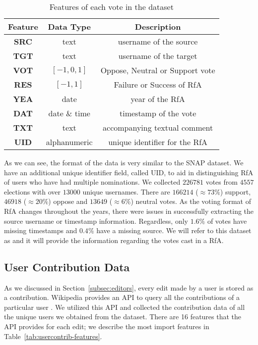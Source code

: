 \begin{table}[htp]
    \centering
    \caption{Features of each vote in the \wikirfa dataset}
    \label{tab:wiki-rfa-features}
    \begin{tabular}{ccc}
        \toprule
        Feature & Data Type & Description\\
        \midrule
        \textbf{SRC}&text & username of the source\\
        \textbf{TGT}&text & username of the target\\
        \textbf{VOT}&$[-1,0,1]$& Oppose, Neutral or Support vote\\
        \textbf{RES}&$[-1,1]$ & Failure or Success of RfA\\
        \textbf{YEA}&date & year of the RfA\\
        \textbf{DAT}& date \& time & timestamp of the vote\\
        \textbf{TXT}&text &accompanying textual comment \\
        \textbf{UID}&alphanumeric&  unique identifier for the RfA\\
        \bottomrule
    \end{tabular}
\end{table}
As we can see, the format of the data is very similar to the SNAP dataset.
We have an additional unique identifier field, called UID, to aid in distinguishing RfA of users who have had multiple nominations.
We collected $226781$ votes from $4557$ elections with over $13000$ unique usernames. There are $166214$ ($\approx 73\%$) support, $46918$ ($\approx 20\%$) oppose and $13649$ ($\approx 6\%$) neutral votes.
As the voting format of RfA changes throughout the years, there were issues in successfully extracting the source username or timestamp information. 
Regardless, only $1.6\%$ of votes have missing timestamps and $0.4\%$ have a missing source.
We will refer to this dataset as \wikirfa and it will provide the information regarding the votes cast in a RfA.

\subsection{User Contribution Data}
As we discussed in Section~\ref{subsec:editors}, every edit made by a user is stored as a contribution.
Wikipedia provides an API to query all the contributions of a particular user \cite{wiki:Usercontribs-api}.  
We utilized this API and collected the contribution data of all the unique users we obtained from the \wikirfa dataset.
There are 16 features that the API provides for each edit; we describe the most import features in Table~\ref{tab:usercontrib-features}.

